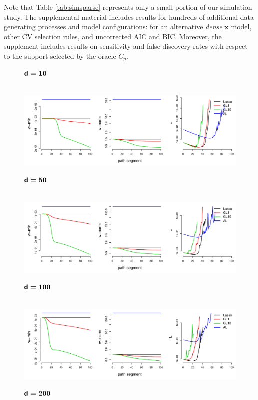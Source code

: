 \documentclass[12pt]{article}
\newcommand{\bm}[1]{\mathbf{#1}}
\begin{document}
Note that Table \ref{tab:simsparse} represents only a small portion of our
simulation study.  The supplemental material includes results for hundreds of
additional data generating processes and model configurations: for an alternative {\it dense} $\bm{x}$ model, other CV selection rules, and uncorrected AIC and BIC.  Moreover, the supplement includes results on sensitivity and false
discovery rates with respect to the support selected by the oracle $C_p$.




\begin{figure}\small
$\boldsymbol{{\sf d} = 10}$

~~~~~~\includegraphics[width=.9\textwidth]{graphs/weights-r09-s1-d10}

$\boldsymbol{{\sf d} = 50}$

~~~~~~\includegraphics[width=.9\textwidth]{graphs/weights-r09-s1-d50}

$\boldsymbol{{\sf d} = 100}$

~~~~~~\includegraphics[width=.9\textwidth]{graphs/weights-r09-s1-d100}

$\boldsymbol{{\sf d} = 200}$


\end{figure}
\end{document}
